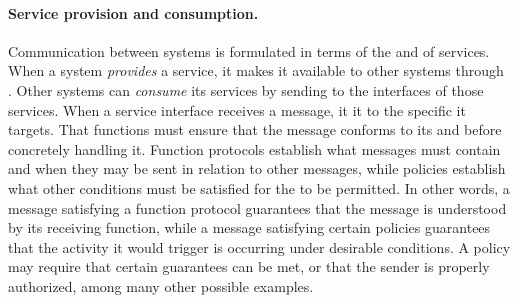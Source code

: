 \paragraph{Service provision and consumption.}
Communication between systems is formulated in terms of the  and  of services.
When a system \textit{provides} a service, it makes it available to other systems through .
Other systems can \textit{consume} its services by sending  to the interfaces of those services.
When a service interface receives a message, it  it to the specific  it targets.
That functions must ensure that the message conforms to its  and  before concretely handling it.
Function protocols establish what messages must contain and when they may be sent in relation to other messages, while policies establish what other conditions must be satisfied for the  to be permitted.
In other words, a message satisfying a function protocol guarantees that the message is understood by its receiving function, while a message satisfying certain policies guarantees that the activity it would trigger is occurring under desirable conditions.
A policy may require that certain  guarantees can be met, or that the sender is properly authorized, among many other possible examples.


